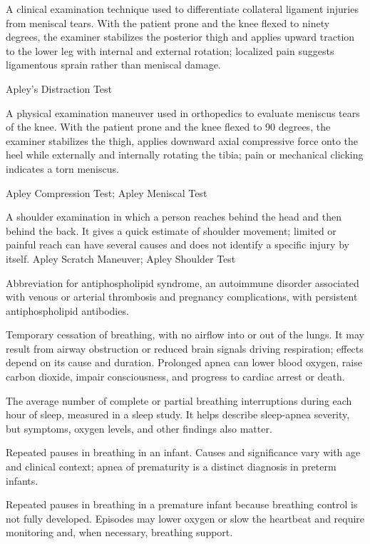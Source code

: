  A clinical examination technique used to differentiate collateral ligament injuries from meniscal tears. With the patient prone and the knee flexed to ninety degrees, the examiner stabilizes the posterior thigh and applies upward traction to the lower leg with internal and external rotation; localized pain suggests ligamentous sprain rather than meniscal damage.

\synonyms
Apley's Distraction Test

 A physical examination maneuver used in orthopedics to evaluate meniscus tears of the knee. With the patient prone and the knee flexed to 90 degrees, the examiner stabilizes the thigh, applies downward axial compressive force onto the heel while externally and internally rotating the tibia; pain or mechanical clicking indicates a torn meniscus.

\synonyms
Apley Compression Test; Apley Meniscal Test

 A shoulder examination in which a person reaches behind the head and then behind the back. It gives a quick estimate of shoulder movement; limited or painful reach can have several causes and does not identify a specific injury by itself.
\synonyms
Apley Scratch Maneuver; Apley Shoulder Test

 Abbreviation for antiphospholipid syndrome, an autoimmune disorder associated with venous or arterial thrombosis and pregnancy complications, with persistent antiphospholipid antibodies.

 Temporary cessation of breathing, with no airflow into or out of the lungs. It may result from airway obstruction or reduced brain signals driving respiration; effects depend on its cause and duration. Prolonged apnea can lower blood oxygen, raise carbon dioxide, impair consciousness, and progress to cardiac arrest or death.

 The average number of complete or partial breathing interruptions during each hour of sleep, measured in a sleep study. It helps describe sleep-apnea severity, but symptoms, oxygen levels, and other findings also matter.

 Repeated pauses in breathing in an infant. Causes and significance vary with age and clinical context; apnea of prematurity is a distinct diagnosis in preterm infants.

 Repeated pauses in breathing in a premature infant because breathing control is not fully developed. Episodes may lower oxygen or slow the heartbeat and require monitoring and, when necessary, breathing support.

